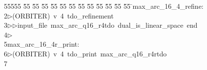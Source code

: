 %
%
\begin{tabbing}
55555 \= 55 \= 55 \= 55 \= 55 \= 55 \= 55 \= 55 \= 55 \= 55 \= 55 \= 55 \= 55 \= \>max\_arc\_16\_4\_refine:\\[0pt]
2\>$\triangleright$\>(ORBITER)\ v\ 4\ tdo\_refinement\ \\[0pt]
3\>$\triangleright$\>$\triangleright$\>input\_file\ max\_arc\_q16\_r4tdo\ dual\_is\_linear\_space\ end\\[0pt]
4\>$\triangleright$\>\\[0pt]
5\>max\_arc\_16\_4r\_print:\\[0pt]
6\>$\triangleright$\>(ORBITER)\ v\ 4\ tdo\_print\ max\_arc\_q16\_r4rtdo\ \\[0pt]
7\>\end{tabbing}
